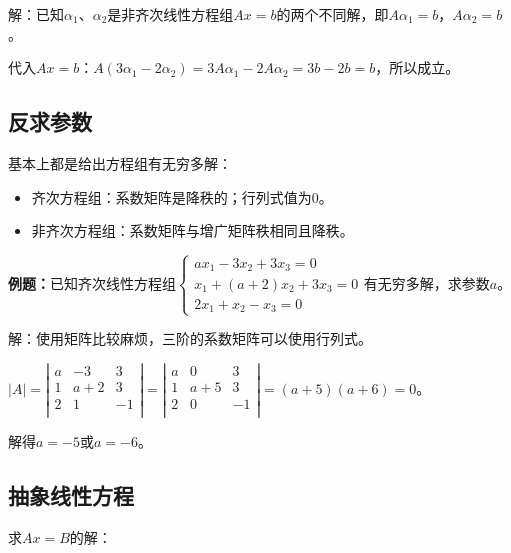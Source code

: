 解：已知$\alpha_1$、$\alpha_2$是非齐次线性方程组$Ax=b$的两个不同解，即$A\alpha_1=b$，$A\alpha_2=b$。

代入$Ax=b$：$A(3\alpha_1-2\alpha_2)=3A\alpha_1-2A\alpha_2=3b-2b=b$，所以成立。


\subsection{反求参数}

基本上都是给出方程组有无穷多解：

\begin{itemize}
    \item 齐次方程组：系数矩阵是降秩的；行列式值为0。
    \item 非齐次方程组：系数矩阵与增广矩阵秩相同且降秩。
\end{itemize}

\textbf{例题：}已知齐次线性方程组$\left\{\begin{array}{l}
    ax_1-3x_2+3x_3=0 \\
    x_1+(a+2)x_2+3x_3=0 \\
    2x_1+x_2-x_3=0
\end{array}\right.$有无穷多解，求参数$a$。

解：使用矩阵比较麻烦，三阶的系数矩阵可以使用行列式。

$\vert A\vert=\left\vert\begin{array}{ccc}
    a & -3 & 3 \\
    1 & a+2 & 3 \\
    2 & 1 & -1 \\
\end{array}\right\vert=\left\vert\begin{array}{ccc}
    a & 0 & 3 \\
    1 & a+5 & 3 \\
    2 & 0 & -1 \\
\end{array}\right\vert=(a+5)(a+6)=0$。

解得$a=-5$或$a=-6$。

\subsection{抽象线性方程}

求$Ax=B$的解：

